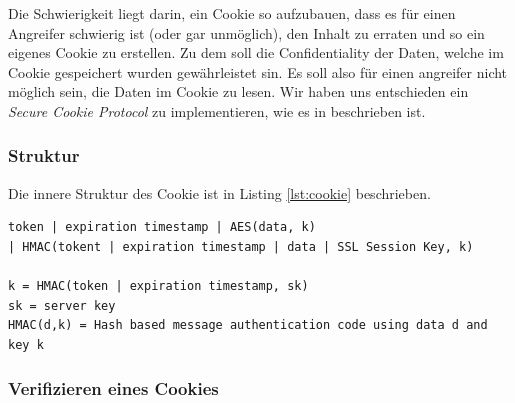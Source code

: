 Die Schwierigkeit liegt darin, ein Cookie so aufzubauen, dass es für einen Angreifer schwierig ist (oder gar unmöglich), den Inhalt zu
erraten und so ein eigenes Cookie zu erstellen. Zu dem soll die Confidentiality der Daten, welche im Cookie gespeichert wurden
gewährleistet sin. Es soll also für einen angreifer nicht möglich sein, die Daten im Cookie zu lesen. Wir haben uns entschieden
ein \textit{Secure Cookie Protocol} zu implementieren, wie es in \cite{securecookie} beschrieben ist.

\subsubsection{Struktur}

Die innere Struktur des Cookie ist in Listing \ref{lst:cookie} beschrieben.

\begin{lstlisting}[caption=Innere Struktur des Cookie,label={lst:cookie}]
token | expiration timestamp | AES(data, k) 
| HMAC(tokent | expiration timestamp | data | SSL Session Key, k)

k = HMAC(token | expiration timestamp, sk)
sk = server key
HMAC(d,k) = Hash based message authentication code using data d and key k
\end{lstlisting}

\subsubsection{Verifizieren eines Cookies}

